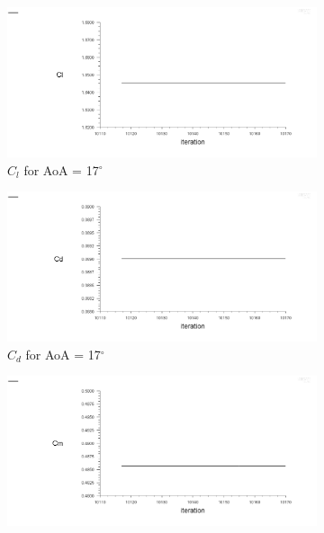 \begin{figure}[H]
  \begin{subfigure}[b]{0.5\textwidth}
    \includegraphics[width=\textwidth]{17_deg/AoA_17_cl.png}
    \caption{$C_l$ for AoA = 17$^\circ$}
    \label{fig:aoa_17_cl}
  \end{subfigure}
  \hfill
  \begin{subfigure}[b]{0.5\textwidth}
    \includegraphics[width=\textwidth]{17_deg/AoA_17_cd.png}
    \caption{$C_d$ for AoA = 17$^\circ$}
    \label{fig:aoa_17_cd}
  \end{subfigure}
  \begin{subfigure}[b]{0.5\textwidth}
    \includegraphics[width=\textwidth]{17_deg/AoA_17_cm.png}

\end{subfigure}
\end{figure}
